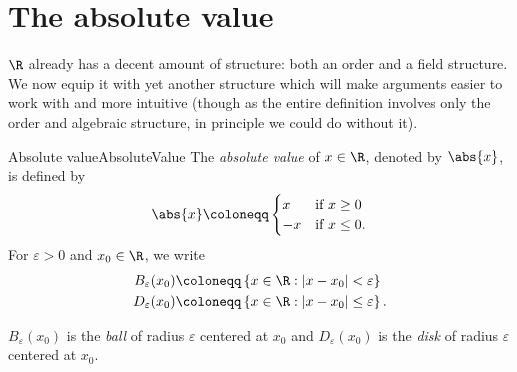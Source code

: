 \section{The absolute value}

$\R$ already has a decent amount of structure:  both an order and a field structure.  We now equip it with yet another structure which will make arguments easier to work with and more intuitive (though as the entire definition involves only the order and algebraic structure, in principle we could do without it).
\begin{dfn}{Absolute value}{AbsoluteValue}
The \emph{absolute value} of $x\in \R$, denoted by $\abs{x}$, is defined by
\begin{equation}
\abs{x}\coloneqq \begin{cases}x & \text{if }x\geq 0 \\ -x & \text{if }x\leq 0.\end{cases}
\end{equation}
For $\varepsilon >0$ and $x_0\in \R$, we write
\begin{equation}
\begin{aligned}
B_{\varepsilon}(x_0) & \coloneqq \left\{ x\in \R :|x-x_0|<\varepsilon \right\} \\
D_{\varepsilon}(x_0) & \coloneqq \left\{ x\in \R :|x-x_0|\leq \varepsilon \right\} .
\end{aligned}
\end{equation}
\begin{rmk}
$B_{\varepsilon}(x_0)$ is the \emph{ball} of radius $\varepsilon$ centered at $x_0$ and $D_{\varepsilon}(x_0)$ is the \emph{disk} of radius $\varepsilon$ centered at $x_0$.
\end{rmk}
\end{dfn}
